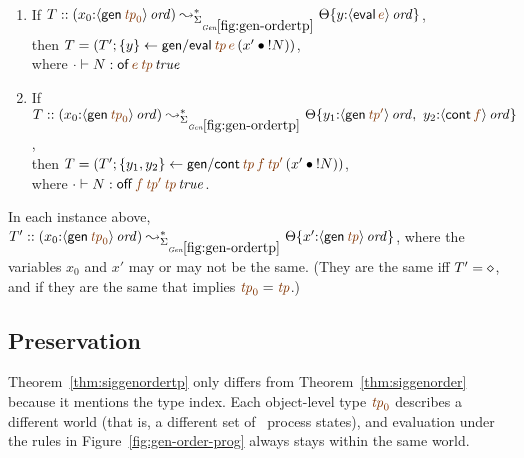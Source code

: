 \bigskip
\begin{lemma}~
\begin{enumerate}
\item If 
   $T :: (x_0{:}\istrue{\susp{{\sf gen}\,\lf{{\it tp}_0}}}) 
         \leadsto^*_{\siggenordertp}
         \tackon{\Theta}{y{:}\istrue{\susp{{\sf eval}\,\lf{e}}}}$,
\\ then 
   $T = \left(T'; \trstep{y}{{\sf gen/eval}\,\lf{{\it tp}}\,\lf{e}\,(\tfuser{x'}{\tbangr{N}})}\right)$,
\\ where $\cdot \vdash N : \isconc{{\sf of}\,\lf{e}\,\lf{{\it tp}}}$
\medskip
\item If 
   $T :: (x_0{:}\istrue{\susp{{\sf gen}\,\lf{{\it tp}_0}}})
         \leadsto^*_{\siggenordertp}
         \tackon{\Theta}{y_1{:}\istrue{\susp{{\sf gen}\,\lf{{\it tp}'}}}, ~
                         y_2{:}\istrue{\susp{{\sf cont}\,\lf{f}}}}$,
\\ then 
   $T = \left(T'; \trstep{y_1,y_2}{{\sf gen/cont}\,\lf{{\it tp}}\,\lf{f}\,\lf{{\it tp}'}\,(\tfuser{x'}{\tbangr{N}})}\right)$,
\\ where 
   $\cdot \vdash N : \isconc{{{{\sf off}\,\lf{f}\,\lf{{\it tp}'}\,\lf{{\it tp}}}}}$.
\medskip
\end{enumerate}
In each instance above, 
$T' :: (x_0{:}\istrue{\susp{{\sf gen}\,\lf{{\it tp}_0}}}) \leadsto^*_{\siggenordertp}
          \tackon{\Theta}{x'{:}\istrue{\susp{{\sf gen}\,\lf{{\it tp}}}}}$,
where the variables $x_0$ and $x'$ may or may not
be the same. (They are the same iff $T' = \diamond$, and if they
are the same that implies $\lf{{\it tp}_0} = \lf{{\it tp}}$.)
\end{lemma}
\bigskip



\subsection{Preservation}


Theorem~\ref{thm:siggenordertp} only differs from
Theorem~\ref{thm:siggenorder} because it mentions the type index.
Each object-level type $\lf{{\it tp}_0}$ describes a different world
(that is, a different set of \sls~process states),
and evaluation under the rules in Figure~\ref{fig:gen-order-prog}
always stays within the same world.

